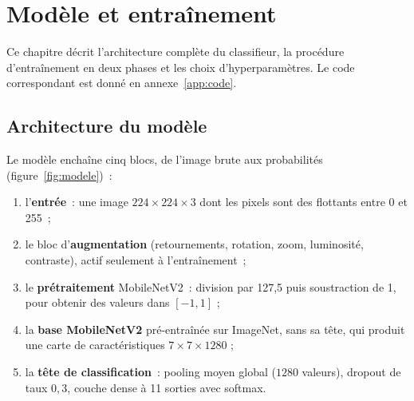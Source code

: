 \chapter{Modèle et entraînement}\label{chap:modele}

Ce chapitre décrit l’architecture complète du classifieur, la procédure d’entraînement en deux phases et les choix d’hyperparamètres. Le code correspondant est donné en annexe~\ref{app:code}.

\section{Architecture du modèle}

Le modèle enchaîne cinq blocs, de l’image brute aux probabilités (figure~\ref{fig:modele})~:

\begin{enumerate}
  \item l’\textbf{entrée}~: une image $224\times224\times3$ dont les pixels sont des flottants entre 0 et 255~;
  \item le bloc d’\textbf{augmentation} (retournements, rotation, zoom, luminosité, contraste), actif seulement à l’entraînement~;
  \item le \textbf{prétraitement} MobileNetV2~: division par 127,5 puis soustraction de 1, pour obtenir des valeurs dans $[-1,1]$ ;
  \item la \textbf{base MobileNetV2} pré-entraînée sur ImageNet, sans sa tête, qui produit une carte de caractéristiques $7\times7\times1280$ ;
  \item la \textbf{tête de classification}~: pooling moyen global ($1280$ valeurs), dropout de taux $0{,}3$, couche dense à 11 sorties avec softmax.
\end{enumerate}

